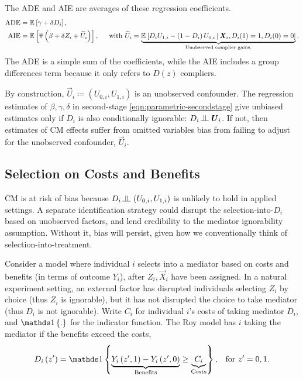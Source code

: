 The ADE and AIE are averages of these regression coefficients.
\begin{align*}
    \text{ADE}
        &= \mathbb{E}_{} \left[ \gamma + \delta D_i \right], \\
    \text{AIE}
        &= \mathbb{E}_{} \left[  \overline{\pi} \left( \beta +  \delta Z_i + \widetilde{U}_i \right) \right],
        \;\;\;\; \text{ with } \widetilde{U}_i
            = \underbrace{\mathbb{E}_{} \left[  D_i U_{1,i} - \left(1 - D_i \right)U_{0,i} \, \middle\vert \, 
                \boldsymbol{\mathit{X}}_i, D_i(1) = 1, D_i(0) = 0 \right]}_{
                    \text{Unobserved complier gains.}}.
\end{align*}
The ADE is a simple sum of the coefficients, while the AIE includes a group differences term because it only refers to $D(z)$ compliers.

By construction, $\vec U_i \coloneqq \left(U_{0, i}, U_{1, i} \right)$ is an unobserved confounder.
The regression estimates of $\beta, \gamma, \delta$ in second-stage \eqref{eqn:parametric-secondstage} give unbiased estimates only if $D_i$ is also conditionally ignorable: $D_i \indep  \vec U_{i} $.
If not, then estimates of CM effects suffer from omitted variables bias from failing to adjust for the unobserved confounder, $\vec U_i$.

\subsection{Selection on Costs and Benefits}
CM is at risk of bias because $D_i \indep  \left(U_{0, i}, U_{1, i} \right)$ is unlikely to hold in applied settings.
A separate identification strategy could disrupt the selection-into-$D_i$ based on unobserved factors, and lend credibility to the mediator ignorability assumption.
Without it, bias will persist, given how we conventionally think of selection-into-treatment.

Consider a model where individual $i$ selects into a mediator based on costs and benefits (in terms of outcome $Y_i$), after $Z_i, \vec X_i$ have been assigned.
In a natural experiment setting, an external factor has disrupted individuals selecting $Z_i$ by choice (thus $Z_i$ is ignorable), but it has not disrupted the choice to take mediator (thus $D_i$ is not ignorable).
Write $C_i$ for individual $i$'s costs of taking mediator $D_i$, and $\indicator{.}$ for the indicator function.
The Roy model has $i$ taking the mediator if the benefits exceed the costs,
\begin{equation}
    \label{eqn:roy-model}
    D_i \left( z' \right) = \indicator{
    \underbrace{Y_i\left( z', 1 \right) - Y_i\left( z', 0 \right)}_{\text{Benefits}}
    \geq \underbrace{C_i}_{\text{Costs}}}, \;\;\; \text{for } z'=0,1.
\end{equation}

